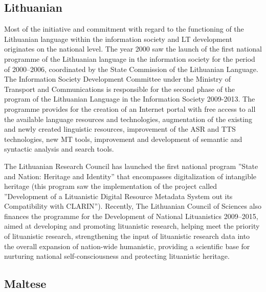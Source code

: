 \documentclass[10pt, plain]{../../metanetpaper}
\begin{document}
\begin{multicols}{2}
\begin{small}
%

\subsection*{Lithuanian}
\label{sec:lithuanian}

Most of the initiative and commitment with regard to the functioning of the Lithuanian language within the information society and LT development originates on the national level. The year 2000 saw the launch of the first national programme of the Lithuanian language in the information society for the period of 2000–2006, coordinated by the State Commission of the Lithuanian Language. The Information Society Development Committee under the Ministry of Transport and Communications is responsible for the second phase of the program of the Lithuanian Language in the Information Society 2009-2013. The programme provides for the creation of an Internet portal with free access to all the available language resources and technologies, augmentation of the existing and newly created linguistic resources, improvement of the ASR and TTS technologies, new MT tools, improvement and development of semantic and syntactic analysis and search tools.

The Lithuanian Research Council has launched the first national program ”State and Nation: Heritage and Identity” that encompasses digitalization of intangible heritage (this program saw the implementation of the project called ”Development of a Lituanistic Digital Resource Metadata System out its Compatibility with CLARIN”).  Recently, The Lithuanian Council of Sciences also finances the programme for the Development of National Lituanistics 2009–2015, aimed at developing and promoting lituanistic research, helping meet the priority of lituanistic research, strengthening the input of lituanistic research data into the overall expansion of nation-wide humanistic, providing a scientific base for nurturing national self-consciousness and protecting lituanistic heritage.

\subsection*{Maltese}
\label{sec:maltese}


\end{small}
\end{multicols}
\end{document}
